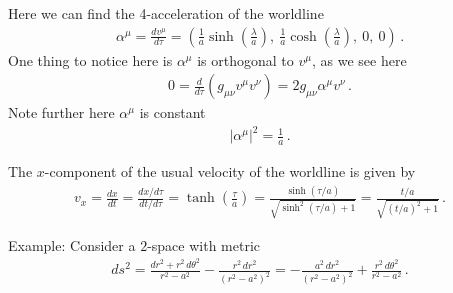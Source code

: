 \documentclass[11pt, onesided]{book}
\theoremstyle{break}
\theoremstyle{break}
\newcommand{\example}{\color{green}Example: \color{black}}
\begin{document}
Here we can find the 4-acceleration of the worldline
\begin{align*}
\alpha^\mu = \frac{dv^\mu}{d\tau} = \left( \frac{1}{a}\sinh\left( \frac{\lambda}{a}\right),\ \frac{1}{a}\cosh\left( \frac{\lambda}{a}\right),\ 0,\ 0\right)\,.
\end{align*}
One thing to notice here is $\alpha^\mu$ is orthogonal to $v^\mu$, as we see here
\begin{align*}
0 = \frac{d}{d\tau}\left( g_{\mu\nu}v^\mu v^\nu\right) = 2g_{\mu\nu}\alpha^\mu v^\nu\,.
\end{align*}
Note further here $\alpha^\mu$ is constant 
\begin{align*}
|\alpha^\mu|^2 = \frac{1}{a}\,.
\end{align*}

The $x$-component of the usual velocity of the worldline is given by
\begin{align*}
v_x = \frac{dx}{dt} = \frac{dx/d\tau}{dt/d\tau} = \tanh\left( \frac{\tau}{a}\right) = \frac{\sinh(\tau/a)}{\sqrt{\sinh^2(\tau/a) + 1}} = \frac{t/a}{\sqrt{(t/a)^2+1}}\,.
\end{align*}

\example Consider a $2$-space with metric
\begin{align*}
ds^2 = \frac{dr^2 + r^2\, d\theta^2}{r^2 - a^2} - \frac{r^2 \, dr^2}{(r^2 - a^2)^2} =-\frac{a^2\, dr^2}{(r^2 - a^2)^2} + \frac{r^2\, d\theta^2}{r^2 - a^2}\,.
\end{align*}
\end{document}
